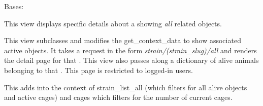\documentclass[letterpaper,10pt,english]{sphinxmanual}
\begin{document}
\begin{fulllineitems}

\begin{fulllineitems}
\label{api:mousedb.animal.views.StrainDetail.slug_field}
\end{fulllineitems}


\begin{fulllineitems}
\label{api:mousedb.animal.views.StrainDetail.template_name}
\end{fulllineitems}


\end{fulllineitems}


\begin{fulllineitems}
\label{api:mousedb.animal.views.StrainDetailAll}
Bases: {\hyperref[api:mousedb.animal.views.StrainDetail]{}}

This view displays specific details about a {\hyperref[api:mousedb.animal.models.Strain]{}} showing \emph{all} related objects.

This view subclasses {\hyperref[api:mousedb.animal.views.StrainDetail]{}} and modifies the get\_context\_data to show associated active objects.
It takes a request in the form \emph{strain/(strain\_slug)/all} and renders the detail page for that {\hyperref[api:mousedb.animal.models.Strain]{}}.
This view also passes along a dictionary of alive animals belonging to that {\hyperref[api:mousedb.animal.models.Strain]{}}.
This page is restricted to logged-in users.

\begin{fulllineitems}
\label{api:mousedb.animal.views.StrainDetailAll.get_context_data}
This adds into the context of strain\_list\_all (which filters for all alive {\hyperref[api:mousedb.animal.models.Animal]{}} objects and active cages) and cages which filters for the number of current cages.

\end{fulllineitems}


\end{fulllineitems}
\end{document}
